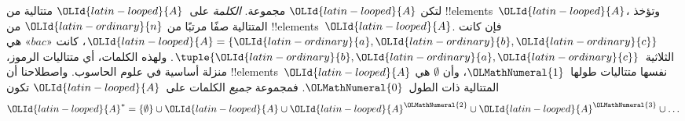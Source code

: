 \documentclass[../../../include/open-logic-section]{subfiles}
\begin{document}
\begin{ex}
لتكن ${\OLId{latin-looped}{A}}$ مجموعة. \emph{الكلمة} على~${\OLId{latin-looped}{A}}$ متتالية من !!{element}s~${\OLId{latin-looped}{A}}$، وتؤخذ
المتتالية صفًا مرتبًا من ${\OLId{latin-ordinary}{n}}$ من !!{element}s~${\OLId{latin-looped}{A}}$. فإن كانت
${\OLId{latin-looped}{A}} = \{{\OLId{latin-ordinary}{a}}, {\OLId{latin-ordinary}{b}}, {\OLId{latin-ordinary}{c}}\}$، كانت «$bac$» هي الثلاثية~$\tuple{{\OLId{latin-ordinary}{b}}, {\OLId{latin-ordinary}{a}}, {\OLId{latin-ordinary}{c}}}$.
ولهذه الكلمات، أي متتاليات الرموز، منزلة أساسية في علوم الحاسوب.
واصطلاحنا أن !!{element}s~${\OLId{latin-looped}{A}}$ نفسها متتاليات طولها~${\OLMathNumeral{1}}$، وأن
$\emptyset$ هي المتتالية ذات الطول~${\OLMathNumeral{0}}$. فمجموعة \emph{جميع} الكلمات
على~${\OLId{latin-looped}{A}}$ تكون
\[
{\OLId{latin-looped}{A}}^* = \{\emptyset\} \cup {\OLId{latin-looped}{A}} \cup {\OLId{latin-looped}{A}}^{\OLMathNumeral{2}} \cup {\OLId{latin-looped}{A}}^{\OLMathNumeral{3}} \cup \dots
\]
\end{ex}
\end{document}
